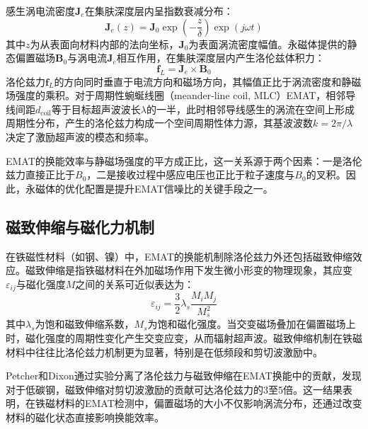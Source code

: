 感生涡电流密度$\mathbf{J}_e$在集肤深度层内呈指数衰减分布：
\begin{equation}
\mathbf{J}_e(z) = \mathbf{J}_0 \exp\left(-\frac{z}{\delta}\right) \exp(j\omega t)
\label{eq:eddy_current}
\end{equation}
其中$z$为从表面向材料内部的法向坐标，$\mathbf{J}_0$为表面涡流密度幅值。永磁体提供的静态偏置磁场$\mathbf{B}_0$与涡电流$\mathbf{J}_e$相互作用，在集肤深度层内产生洛伦兹体积力\cite{thompson1973electromagnetic, kawashima1976theory}：
\begin{equation}
\mathbf{f}_L = \mathbf{J}_e \times \mathbf{B}_0
\label{eq:lorentz_force}
\end{equation}
洛伦兹力$\mathbf{f}_L$的方向同时垂直于电流方向和磁场方向，其幅值正比于涡流密度和静磁场强度的乘积。对于周期性蜿蜒线圈（meander-line coil, MLC）EMAT，相邻导线间距$d_{\text{coil}}$等于目标超声波波长$\lambda$的一半\cite{pei2016modified}，此时相邻导线感生的涡流在空间上形成周期性分布，产生的洛伦兹力构成一个空间周期性体力源，其基波波数$k = 2\pi/\lambda$决定了激励超声波的模态和频率。

EMAT的换能效率与静磁场强度的平方成正比\cite{pei2016modified}，这一关系源于两个因素：一是洛伦兹力直接正比于$B_0$，二是接收过程中感应电压也正比于粒子速度与$B_0$的叉积。因此，永磁体的优化配置是提升EMAT信噪比的关键手段之一\cite{gou2024magnetic}。

\subsection{磁致伸缩与磁化力机制}

在铁磁性材料（如钢、镍）中，EMAT的换能机制除洛伦兹力外还包括磁致伸缩效应\cite{hirao2003emat}。磁致伸缩是指铁磁材料在外加磁场作用下发生微小形变的物理现象，其应变$\varepsilon_{ij}$与磁化强度$M$之间的关系可近似表达为：
\begin{equation}
\varepsilon_{ij} = \frac{3}{2}\lambda_s \frac{M_i M_j}{M_s^2}
\label{eq:magnetostriction}
\end{equation}
其中$\lambda_s$为饱和磁致伸缩系数，$M_s$为饱和磁化强度。当交变磁场叠加在偏置磁场上时，磁化强度的周期性变化产生交变应变，从而辐射超声波。磁致伸缩机制在铁磁材料中往往比洛伦兹力机制更为显著\cite{petcher2015separation}，特别是在低频段和剪切波激励中。

Petcher和Dixon\cite{petcher2015separation}通过实验分离了洛伦兹力与磁致伸缩在EMAT换能中的贡献，发现对于低碳钢，磁致伸缩对剪切波激励的贡献可达洛伦兹力的3至5倍。这一结果表明，在铁磁材料的EMAT检测中，偏置磁场的大小不仅影响涡流分布，还通过改变材料的磁化状态直接影响换能效率。

